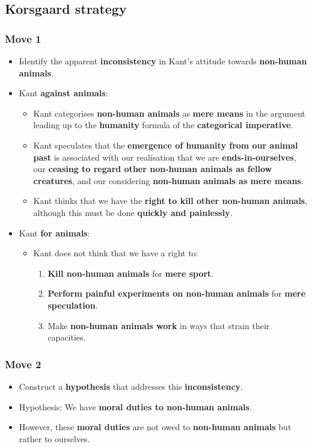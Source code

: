 \documentclass[11pt]{article}
\begin{document}
\subsection{Korsgaard strategy}
\label{sec:orgdd18276}

\subsubsection{Move 1}
\label{sec:org9127410}
\begin{itemize}
\item Identify the apparent \textbf{inconsistency} in Kant's attitude towards \textbf{non-human animals}.
\item Kant \textbf{against animals}:
\begin{itemize}
\item Kant categorises \textbf{non-human animals} as \textbf{mere means} in the argument leading up to the \textbf{humanity} formula of the \textbf{categorical imperative}.
\item Kant speculates that the \textbf{emergence of humanity from our animal past} is associated with our realisation that we are \textbf{ends-in-ourselves}, our \textbf{ceasing to regard other non-human animals as fellow creatures}, and our considering \textbf{non-human animals as mere means}.
\item Kant thinks that we have the \textbf{right to kill other non-human animals}, although this must be done \textbf{quickly and painlessly}.
\end{itemize}
\item Kant \textbf{for animals}:
\begin{itemize}
\item Kant does not think that we have a right to:
\begin{enumerate}
\item \textbf{Kill non-human animals} for \textbf{mere sport}.
\item \textbf{Perform painful experiments on non-human animals} for \textbf{mere speculation}.
\item Make \textbf{non-human animals work} in ways that strain their capacities.
\end{enumerate}
\end{itemize}
\end{itemize}
\subsubsection{Move 2}
\label{sec:org2cd6bcd}
\begin{itemize}
\item Construct a \textbf{hypothesis} that addresses this \textbf{inconsistency}.
\item Hypothesis: We have \textbf{moral duties to non-human animals}.
\item However, these \textbf{moral duties} are not owed to \textbf{non-human animals} but rather to ourselves.
\end{itemize}
\end{document}

